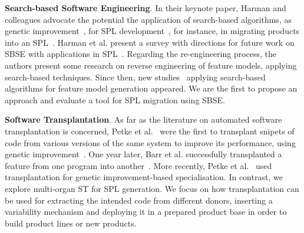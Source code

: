 \textbf{Search-based Software Engineering}. In their keynote paper, Harman and colleagues advocate the potential the application of search-based algorithms, as genetic improvement~\cite{Petke18:genetic}, for SPL development~\cite{Harman2014a}, for instance, in migrating products into an SPL~\cite{Rubin2013b, Fischer2014}. Harman et al. present a survey with directions for future work on SBSE with applications in SPL~\cite{Harman2014a}. Regarding the re-engineering process, the authors present some research on reverse engineering of feature models, applying search-based techniques. Since then, new studies~\cite{Segura2013,  Linsbauer2014, Lopez2015}  applying search-based algorithms for feature model generation appeared. We are the first to propose an approach and evaluate a tool for SPL migration using SBSE.

\textbf{Software Transplantation}. As far as the literature on automated software transplantation is concerned, Petke et al.~\cite{Petke2014,Petke2018} were the first to transplant snipets of code from various versions of the same system to improve its performance, using genetic improvement~\cite{Petke18:genetic}. One year later, Barr et al. successfully transplanted a feature from one program into another~\cite{Barr2015}. 
More recently, Petke et al.~\cite{Petke2018} used transplantation for genetic improvement-based specialisation. In contrast, we explore multi-organ ST for SPL generation. We focus on how transplantation can be used for extracting the intended code from different donors, inserting a variability mechanism and deploying it in a prepared product base in order to build product lines or new products.

